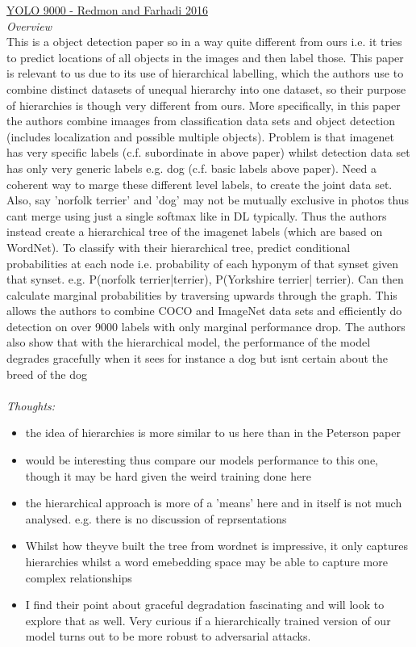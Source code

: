 \documentclass{report}
\begin{document}
\underline{YOLO 9000 - Redmon and Farhadi 2016} \\ 
\textit{Overview} \\
This is a object detection paper so in a way quite different from ours i.e. it tries to predict locations of all objects in the images and then label those. This paper is relevant to us due to its use of hierarchical labelling, which the authors use to combine distinct datasets of unequal hierarchy into one dataset, so their purpose of hierarchies is though very different from ours. More specifically, in this paper the authors combine imaages from classification data sets and object detection (includes localization and possible multiple objects). Problem is that imagenet has very specific labels (c.f. subordinate in above paper) whilst detection data set has only very generic labels e.g. dog (c.f. basic labels above paper). Need a coherent way to marge these different level labels, to create the joint data set. Also, say 'norfolk terrier' and 'dog' may not be mutually exclusive in photos thus cant merge using just a single softmax like in DL typically. Thus the authors instead create a hierarchical tree of the imagenet labels (which are based on WordNet). To classify with their hierarchical tree, predict conditional probabilities at each node i.e. probability of each hyponym of that synset given that synset. e.g. P(norfolk terrier|terrier), P(Yorkshire terrier| terrier). Can then calculate marginal probabilities by traversing upwards through the graph. This allows the authors to combine COCO and ImageNet data sets and efficiently do detection on over 9000 labels with only marginal performance drop. The authors also show that with the hierarchical model, the performance of the model degrades gracefully when it sees for instance a dog but isnt certain about the breed of the dog \\ \\
\textit{Thoughts:}
\begin{itemize}
\item the idea of hierarchies is more similar to us here than in the Peterson paper
\item would be interesting thus compare our models performance to this one, though it may be hard given the weird training done here
\item the hierarchical approach is more of a 'means' here and in itself is not much analysed. e.g. there is no discussion of reprsentations
\item Whilst how theyve built the tree from wordnet is impressive, it only captures hierarchies whilst a word emebedding space may be able to capture more complex relationships
\item I find their point about graceful degradation fascinating and will look to explore that as well. Very curious if a hierarchically trained version of our model turns out to be more robust to adversarial attacks. 
\end{itemize} 
\end{document}
